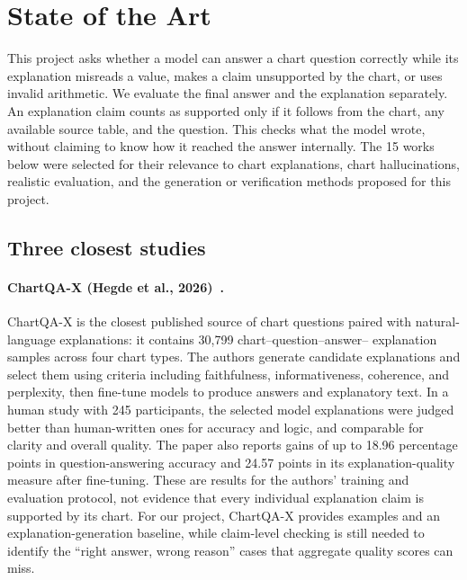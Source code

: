 \section{State of the Art}
\label{sec:state-of-the-art}

This project asks whether a model can answer a chart question correctly while its explanation misreads a value, makes a claim unsupported by the chart, or uses invalid arithmetic. We evaluate the final answer and the explanation separately. An explanation claim counts as supported only if it follows from the chart, any available source table, and the question. This checks what the model wrote, without claiming to know how it reached the answer internally. The 15 works below were selected for their relevance to chart explanations, chart hallucinations, realistic evaluation, and the generation or verification methods proposed for this project.

\subsection{Three closest studies}

\paragraph{ChartQA-X (Hegde et al., 2026)~\cite{hegde2026chartqax}.} ChartQA-X is the closest published source of chart questions paired with natural-language explanations: it contains 30,799 chart--question--answer-- explanation samples across four chart types. The authors generate candidate explanations and select them using criteria including faithfulness, informativeness, coherence, and perplexity, then fine-tune models to produce answers and explanatory text. In a human study with 245 participants, the selected model explanations were judged better than human-written ones for accuracy and logic, and comparable for clarity and overall quality. The paper also reports gains of up to 18.96 percentage points in question-answering accuracy and 24.57 points in its explanation-quality measure after fine-tuning. These are results for the authors' training and evaluation protocol, not evidence that every individual explanation claim is supported by its chart. For our project, ChartQA-X provides examples and an explanation-generation baseline, while claim-level checking is still needed to identify the ``right answer, wrong reason'' cases that aggregate quality scores can miss.

